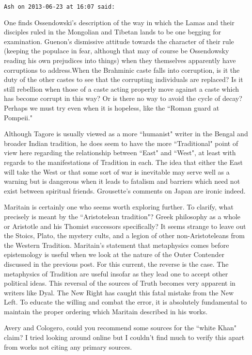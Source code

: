 \begin{footnotesize}
\begin{sffamily}
\hfill

\texttt{Ash on 2013-06-23 at 16:07 said: }

One finds Ossendowski's description of the way in which the Lamas and their disciples ruled in the Mongolian and Tibetan lands to be one begging for examination. Guenon's dismissive attitude towards the character of their rule (keeping the populace in fear, although that may of course be Ossendowsky reading his own prejudices into things) when they themselves apparently have corruptions to address.When the Brahminic caste falls into corruption, is it the duty of the other castes to see that the corrupting individuals are replaced? Is it still rebellion when those of a caste acting properly move against a caste which has become corrupt in this way? Or is there no way to avoid the cycle of decay? Perhaps we must try even when it is hopeless, like the ``Roman guard at Pompeii."

Although Tagore is usually viewed as a more ``humanist" writer in the Bengal and broader Indian tradition, he does seem to have the more ``Traditional" point of view here regarding the relationship between ``East" and ``West", at least with regards to the manifestations of Tradition in each. The idea that either the East will take the West or that some sort of war is inevitable may serve well as a warning but is dangerous when it leads to fatalism and barriers which need not exist between spiritual friends. Grousette's comments on Japan are ironic indeed.

Maritain is certainly one who seems worth exploring further. To clarify, what precisely is meant by the ``Aristotelean tradition"? Greek philosophy as a whole or Aristotle and his Thomist successors specifically? It seems strange to leave out the Stoics, Plato, the mystery cults, and a legion of other non-Aristoteleans from the Western Tradition. Maritain's statement that metaphysics comes before epistemology is useful when we look at the nature of the Outer Contender discussed in the previous post. For this current, the reverse is the case. The metaphysics of Tradition are useful insofar as they lead one to accept other political ideas. This reversal of the sources of Truth becomes very apparent in writers like Dyal. The New Right has caught this fatal mistake from the New Left. To educate the willing and combat the error, it is absolutely fundamental to maintain the proper ordering which Maritain described in his works. 

Avery and Cologero, could you recommend some sources for the ``white Khan" claim? I tried looking around online but I couldn't find much to verify this apart from works not citing any primary sources.



\end{sffamily}
\end{footnotesize}
